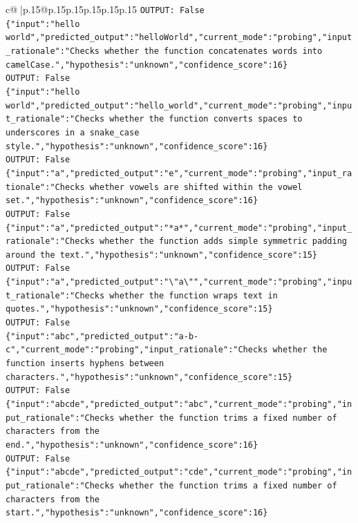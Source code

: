 \documentclass{article}
\begin{document}
{\begin{supertabular}{c@{$\;$}|p{.15\linewidth}@{}p{.15\linewidth}p{.15\linewidth}p{.15\linewidth}p{.15\linewidth}p{.15\linewidth}}
{{{\texttt{OUTPUT: False} \\
\texttt{\{"input":"hello world","predicted\_output":"helloWorld","current\_mode":"probing","input\_rationale":"Checks whether the function concatenates words into camelCase.","hypothesis":"unknown","confidence\_score":16\}} \\
\texttt{OUTPUT: False} \\
\texttt{\{"input":"hello world","predicted\_output":"hello\_world","current\_mode":"probing","input\_rationale":"Checks whether the function converts spaces to underscores in a snake\_case style.","hypothesis":"unknown","confidence\_score":16\}} \\
\texttt{OUTPUT: False} \\
\texttt{\{"input":"a","predicted\_output":"e","current\_mode":"probing","input\_rationale":"Checks whether vowels are shifted within the vowel set.","hypothesis":"unknown","confidence\_score":16\}} \\
\texttt{OUTPUT: False} \\
\texttt{\{"input":"a","predicted\_output":"*a*","current\_mode":"probing","input\_rationale":"Checks whether the function adds simple symmetric padding around the text.","hypothesis":"unknown","confidence\_score":15\}} \\
\texttt{OUTPUT: False} \\
\texttt{\{"input":"a","predicted\_output":"\textbackslash{}"a\textbackslash{}"","current\_mode":"probing","input\_rationale":"Checks whether the function wraps text in quotes.","hypothesis":"unknown","confidence\_score":15\}} \\
\texttt{OUTPUT: False} \\
\texttt{\{"input":"abc","predicted\_output":"a{-}b{-}c","current\_mode":"probing","input\_rationale":"Checks whether the function inserts hyphens between characters.","hypothesis":"unknown","confidence\_score":15\}} \\
\texttt{OUTPUT: False} \\
\texttt{\{"input":"abcde","predicted\_output":"abc","current\_mode":"probing","input\_rationale":"Checks whether the function trims a fixed number of characters from the end.","hypothesis":"unknown","confidence\_score":16\}} \\
\texttt{OUTPUT: False} \\
\texttt{\{"input":"abcde","predicted\_output":"cde","current\_mode":"probing","input\_rationale":"Checks whether the function trims a fixed number of characters from the start.","hypothesis":"unknown","confidence\_score":16\}} \\
}}}
\end{supertabular}}
\end{document}
